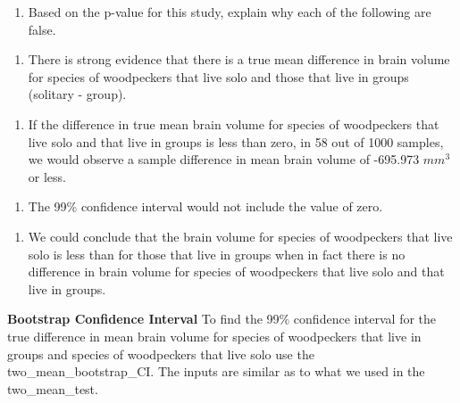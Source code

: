 \documentclass[
]{report}
\providecommand{\tightlist}{%
  \setlength{\itemsep}{0pt}\setlength{\parskip}{0pt}}
\begin{document}
\begin{enumerate}
\def\labelenumi{\arabic{enumi}.}
\setcounter{enumi}{4}
\tightlist
\item
  Based on the p-value for this study, explain why each of the following are false.
\end{enumerate}

\begin{enumerate}
\def\labelenumi{\Alph{enumi}.}
\tightlist
\item
  There is strong evidence that there is a true mean difference in brain volume for species of woodpeckers that live solo and those that live in groups (solitary - group).
\end{enumerate}

\vspace{0.5in}

\begin{enumerate}
\def\labelenumi{\Alph{enumi}.}
\setcounter{enumi}{1}
\tightlist
\item
  If the difference in true mean brain volume for species of woodpeckers that live solo and that live in groups is less than zero, in 58 out of 1000 samples, we would observe a sample difference in mean brain volume of -695.973 \(mm^3\) or less.
\end{enumerate}

\vspace{0.5in}

\begin{enumerate}
\def\labelenumi{\Alph{enumi}.}
\setcounter{enumi}{2}
\tightlist
\item
  The 99\% confidence interval would not include the value of zero.
\end{enumerate}

\vspace{0.5in}

\begin{enumerate}
\def\labelenumi{\Alph{enumi}.}
\setcounter{enumi}{3}
\tightlist
\item
  We could conclude that the brain volume for species of woodpeckers that live solo is less than for those that live in groups when in fact there is no difference in brain volume for species of woodpeckers that live solo and that live in groups.
\end{enumerate}

\vspace{0.5in}

\newpage

\textbf{Bootstrap Confidence Interval}
To find the 99\% confidence interval for the true difference in mean brain volume for species of woodpeckers that live in groups and species of woodpeckers that live solo use the two\_mean\_bootstrap\_CI. The inputs are similar as to what we used in the two\_mean\_test.
\end{document}
